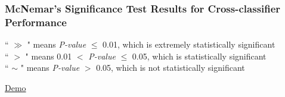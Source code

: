 \documentclass{beamer}
\begin{document}
\begin{frame}
\frametitle{McNemar's Significance Test Results for Cross-classifier Performance}

\begin{table} 
\renewcommand{\arraystretch}{1}
\caption {Statistical significance test results for cross-classifier performance \label{Table: Cross classifier significance test}}
\begin{threeparttable} 
	\begin{tablenotes}
     `` $\gg$ " means \textit{P-value} $\leq$ 0.01, which is extremely statistically significant \\ `` $>$ " means 0.01 $<$ \textit{P-value} $\leq$ 0.05, which is statistically significant \\ `` $\sim$ " means \textit{P-value} $>$ 0.05, which is not statistically significant
    \end{tablenotes}
  \end{threeparttable}
\end{table} 
\href{run:Mcnemar.pdf}{Demo}
\end{frame}
\end{document}
